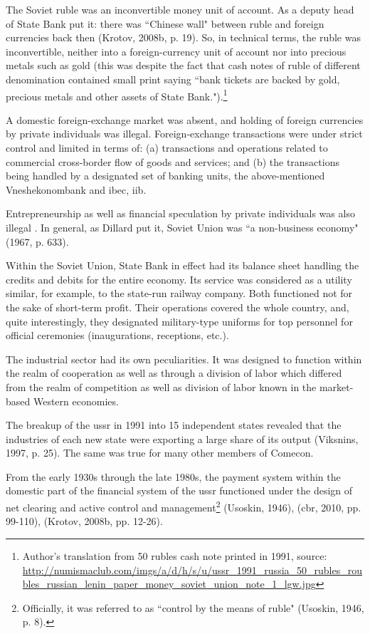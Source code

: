 The Soviet ruble was an inconvertible money unit of account. As a deputy head of State Bank put it: there was ``Chinese wall" between ruble and foreign currencies back then (Krotov, 2008b, p. 19). So, in technical terms, the ruble was inconvertible, neither into a foreign-currency unit of account nor into precious metals such as gold (this was despite the fact that cash notes of ruble of different denomination contained small print saying ``bank tickets are backed by gold, precious metals and other assets of State Bank.").\footnote{Author's translation from 50 rubles cash note printed in 1991, source: \url{http://numismaclub.com/imgs/a/d/h/s/u/ussr_1991_russia_50_rubles_roubles_russian_lenin_paper_money_soviet_union_note_1_lgw.jpg}}

A domestic foreign-exchange market was absent, and holding of foreign currencies by private individuals was illegal. Foreign-exchange transactions were under strict control and limited in terms of: (a) transactions and operations related to commercial cross-border flow of goods and services; and (b) the transactions being handled by a designated set of banking units, the above-mentioned Vneshekonombank and \ac{ibec}, \ac{iib}.

Entrepreneurship as well as financial speculation by private individuals was also illegal \citep[p.~48]{bashkirova2012}. In general, as Dillard put it, Soviet Union was ``a non-business economy" (1967, p. 633).

Within the Soviet Union, State Bank in effect had its balance sheet handling the credits and debits for the entire economy. Its service was considered as a utility similar, for example, to the state-run railway company. Both functioned not for the sake of short-term profit. Their operations covered the whole country, and, quite interestingly, they designated military-type uniforms for top personnel for official ceremonies (inaugurations, receptions, etc.). 

The industrial sector had its own peculiarities. It was designed to function within the realm of cooperation as well as through a division of labor which differed from the realm of competition as well as division of labor known in the market-based Western economies. 

The breakup of the \ac{ussr} in 1991 into 15 independent states revealed that the industries of each new state were exporting a large share of its output (Viksnins, 1997, p. 25). The same was true for many other members of Comecon. 

From the early 1930s through the late 1980s, the payment system within the domestic part of the financial system of the \ac{ussr} functioned under the design of net clearing and active control and management\footnote{Officially, it was referred to as ``control by the means of ruble" (Usoskin, 1946, p. 8).} (Usoskin, 1946), (\ac{cbr}, 2010, pp. 99-110), (Krotov, 2008b, pp. 12-26). 

